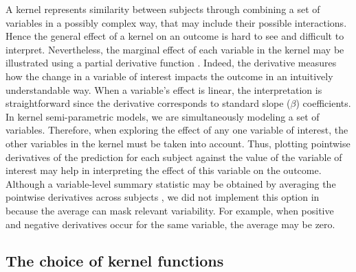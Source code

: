 A kernel represents similarity between subjects through combining a set of variables in a possibly complex way, that may include their possible interactions. Hence the general effect of a kernel on an outcome is hard to see and difficult to interpret. Nevertheless, the marginal effect of each variable in the kernel may be illustrated using a partial derivative function \citep{hainmueller2013kernel}. Indeed, the derivative measures how the change in a variable of interest impacts the outcome in an intuitively understandable way. When a variable's effect is linear, the interpretation is straightforward since the derivative corresponds to standard slope ($\beta$) coefficients. In kernel semi-parametric models, we are simultaneously modeling a set of variables. Therefore, when exploring the effect of any one  variable of interest, the other variables in the kernel must be taken into account. Thus, plotting pointwise derivatives of the prediction for each subject against the value of the variable of interest may help in interpreting the effect of this variable on the outcome. Although a variable-level summary statistic may be obtained by averaging the pointwise derivatives across subjects \citep{hainmueller2013kernel}, we did not implement this option in  because the average can mask relevant variability. For example, when positive and negative derivatives occur for the same variable, the average may be zero.


\subsection{The choice of kernel functions}  \label{sec:models-functions}

